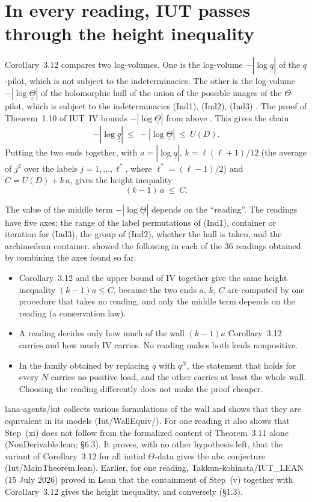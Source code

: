 \documentclass[11pt,a4paper]{article}
\newcommand{\qq}{\underline{\underline{q}}}
\newcommand{\TT}{\underline{\underline{\Theta}}}
\newcommand{\leanus}{\textunderscore\allowbreak}
\newcommand{\lean}[1]{{\ttfamily\let\_\leanus #1}}
\newcommand{\lab}[2]{{\upshape\fcolorbox{#1}{#1!8}{\scriptsize\sffamily\bfseries\textcolor{#1}{#2}}}}
\newcommand{\tagX}{\lab{Purple}{X}}
\newcommand{\tagP}{\lab{ForestGreen}{P}}
\begin{document}
\section{In every reading, IUT passes through the height inequality}
Corollary~3.12 compares two log-volumes. One is the log-volume $-|\log\qq|$ of the $q$-pilot, which is not subject to
the indeterminacies. The other is the log-volume $-|\log\TT|$ of the holomorphic hull of the union of the possible
images of the $\Theta$-pilot, which is subject to the indeterminacies (Ind1), (Ind2), (Ind3) \cite{IUT3}. The proof of
Theorem~1.10 of IUT~IV bounds $-|\log\TT|$ from above \cite{IUT4}. This gives the chain
\[-|\log\qq|\ \le\ -|\log\TT|\ \le\ U(D).\]
Putting the two ends together, with $a=|\log\qq|$, $k=\ell(\ell+1)/12$ (the average of $j^2$ over the labels
$j=1,\dots,\ell^*$, where $\ell^*=(\ell-1)/2$) and $C=U(D)+k\,a$, gives the height inequality
\[(k-1)\,a\ \le\ C.\]

\tagP{} The value of the middle term $-|\log\TT|$ depends on the ``reading''. The readings have five axes: the range
of the label permutations of (Ind1), container or iteration for (Ind3), the group of (Ind2), whether the hull is taken,
and the archimedean container. \cite{RF} showed the following in each of the 36 readings obtained by combining the axes
found so far.
\begin{itemize}
\item Corollary~3.12 and the upper bound of IV together give the same height inequality $(k-1)a\le C$, because the
two ends $a$, $k$, $C$ are computed by one procedure that takes no reading, and only the middle term depends on the
reading (a conservation law).
\item A reading decides only how much of the wall $(k-1)a$ Corollary~3.12 carries and how much IV carries. No reading
makes both loads nonpositive.
\item In the family obtained by replacing $q$ with $q^N$, the statement that holds for every $N$ carries no positive
load, and the other carries at least the whole wall. Choosing the reading differently does not make the proof cheaper.
\end{itemize}

\tagX{} lana-agents/iut \cite{lana} collects various formulations of the wall and shows that they are equivalent in its
models (\lean{Iut/\allowbreak{}WallEquiv/\allowbreak{}}). For one reading it also shows that Step~(xi) does not follow from the formalized
content of Theorem~3.11 alone (\lean{NonDerivable.lean}; \S6.3). It proves, with no other hypothesis left, that the
variant of Corollary~3.12 for all initial $\Theta$-data gives the abc conjecture (\lean{Iut/\allowbreak{}MainTheorem.lean}).
Earlier, for one reading, Takkun-kohinata/IUT\_LEAN \cite{TK} (15 July 2026) proved in Lean that the containment of
Step~(v) together with Corollary~3.12 gives the height inequality, and conversely (\S1.3).
\end{document}
